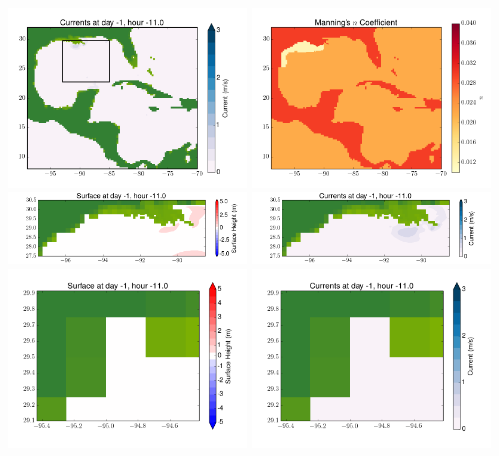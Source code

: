 \documentclass[11pt]{article}
\begin{document}
\includegraphics[width=0.475\textwidth]{frame0037fig2.png}
\vskip 10pt 
\includegraphics[width=0.475\textwidth]{frame0037fig3.png}
\includegraphics[width=0.475\textwidth]{frame0037fig4.png}
\vskip 10pt 
\includegraphics[width=0.475\textwidth]{frame0037fig5.png}
\includegraphics[width=0.475\textwidth]{frame0037fig6.png}
\vskip 10pt 
\includegraphics[width=0.475\textwidth]{frame0037fig7.png}
\end{document}
